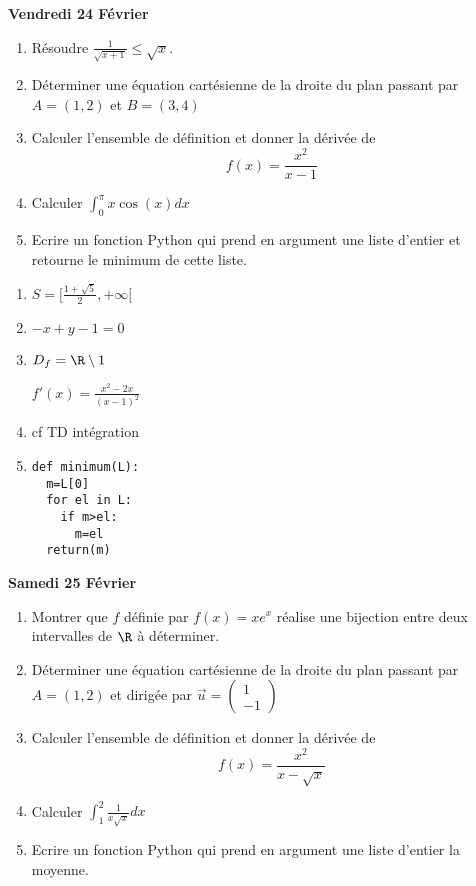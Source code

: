 \documentclass[a4paper, 11pt,reqno]{article}
\newcommand\vv[1]{\overrightarrow{#1}}
\begin{document}
\begin{center}
\textbf{Vendredi 24 Février }
\end{center}

\begin{enumerate}
\item Résoudre $\frac{1}{\sqrt{x+1}}\leq \sqrt{x}$.
\item Déterminer une équation cartésienne de la droite du plan passant par $A=(1,2)$ et $B=(3,4)$
\item Calculer l'ensemble de définition et donner la dérivée de $$f(x) =\frac{x^2}{x-1}$$
\item Calculer $\int_0^\pi x\cos(x)dx$
\item Ecrire un fonction Python qui prend en argument une liste d'entier et retourne le minimum de cette liste. 
\end{enumerate}

\begin{correction}
\begin{enumerate}
\item  $S=[\frac{1+\sqrt{5} }{2}, +\infty[$
\item $-x+y-1=0$
\item $D_f =\R\setminus{1}$

$f'(x) = \frac{x^2-2x }{(x-1)^2}$ 
\item cf TD intégration
\item 
\begin{lstlisting}
def minimum(L):
  m=L[0]
  for el in L:
    if m>el:
      m=el
  return(m)
\end{lstlisting}
\end{enumerate}
\end{correction}
 













\begin{center}
\textbf{Samedi 25 Février }
\end{center}
\begin{enumerate}
\item Montrer que $f $ définie par $f(x) = xe^x$ réalise une bijection entre deux intervalles de $\R$ à déterminer. 
\item Déterminer une équation cartésienne de la droite du plan passant par $A=(1,2)$ et dirigée par $\vv{u}=\begin{pmatrix}
1\\-1
\end{pmatrix}$
\item Calculer l'ensemble de définition et donner la dérivée de $$f(x) =\frac{x^2}{x-\sqrt{x}}$$
\item Calculer $\int_1^2 \frac{1}{x\sqrt{x}} 
dx$
\item Ecrire un fonction Python qui prend en argument une liste d'entier la moyenne. 
\end{enumerate}
\end{document}
